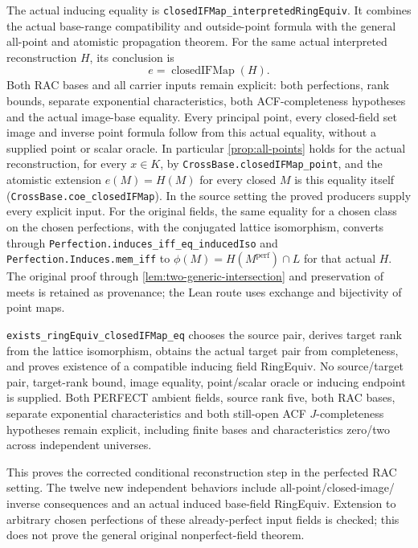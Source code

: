 \documentclass[11pt,oneside]{article}
\theoremstyle{definition}
\theoremstyle{remark}
\newcommand{\lean}[1]{\nolinkurl{#1}}
\begin{document}
The actual inducing equality is \lean{closedIFMap_interpretedRingEquiv}.
It combines the actual base-range compatibility and outside-point formula with the general all-point and
atomistic propagation theorem. For the same actual interpreted reconstruction
$H$, its conclusion is
\[
 e=\operatorname{closedIFMap}(H).
\]
Both RAC bases and all carrier inputs remain explicit: both perfections, rank bounds,
separate exponential characteristics, both ACF-completeness hypotheses and the
actual image-base equality.
Every principal point, every closed-field set image and inverse point formula
follow from this actual equality, without a supplied point or scalar oracle.
In particular \cref{prop:all-points} holds for the actual reconstruction, for every
$x\in K$, by \lean{CrossBase.closedIFMap_point}, and the atomistic extension $e(M)=H(M)$
for every closed $M$ is this equality itself (\lean{CrossBase.coe_closedIFMap}). In the
source setting the proved producers supply every explicit input. For the original fields,
the same equality for a chosen class on the chosen perfections, with the conjugated lattice
isomorphism, converts through \lean{Perfection.induces_iff_eq_inducedIso} and
\lean{Perfection.Induces.mem_iff} to $\phi(M)=H(M^{\mathrm{perf}})\cap L$ for that actual $H$.
The original proof through \cref{lem:two-generic-intersection} and preservation of meets is
retained as provenance; the Lean route uses exchange and bijectivity of point maps.

\lean{exists_ringEquiv_closedIFMap_eq} chooses the source pair, derives target
rank from the lattice isomorphism, obtains the actual target pair from
completeness, and proves existence of a compatible inducing field RingEquiv.
No source/target pair, target-rank bound, image equality, point/scalar oracle
or inducing endpoint is supplied. Both PERFECT ambient fields, source rank
five, both RAC bases, separate exponential characteristics and both still-open
ACF $J$-completeness hypotheses remain explicit, including finite bases and
characteristics zero/two across independent universes.

This proves the corrected conditional reconstruction step in the perfected
RAC setting. The twelve new independent behaviors include all-point/closed-image/
inverse consequences and an actual induced base-field RingEquiv. Extension to
arbitrary chosen perfections of these already-perfect input fields is checked;
this does not prove the general original nonperfect-field theorem.
\end{document}

